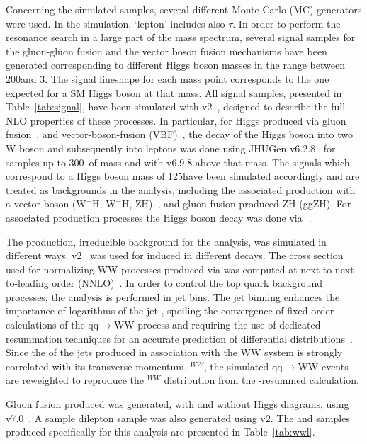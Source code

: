 Concerning the simulated samples, several different Monte Carlo (MC) generators were used. 
In the simulation, `lepton' includes also $\tau$.
In order to perform the resonance search in a large part of the mass spectrum,
several signal samples for the gluon-gluon fusion and the vector boson fusion
mechanisms have been generated corresponding to different Higgs boson masses
in the range between 200\GeV and 3\TeV. The signal lineshape for each mass point corresponds to the one expected for a SM Higgs boson at that mass.
All signal samples, presented in Table~\ref{tab:signal}, have been simulated with
\POWHEG v2~\cite{Nason:2004rx,Frixione:2007vw,Alioli:2010xd}, designed to describe the full NLO properties of these processes.
In particular, for Higgs produced via gluon fusion~\cite{Alioli:2008tz}, and vector-boson-fusion (VBF)~\cite{Nason:2009ai},
the decay of the Higgs boson into two W boson and subsequently into leptons
was done using JHUGen v6.2.8~\cite{jhugen} for samples up to 300~\GeV of mass
and with v6.9.8 above that mass.
The signals which correspond to a Higgs boson mass of 125\GeV have been simulated accordingly and are treated as backgrounds in the analysis, including the associated production with a vector boson ($\mathrm{W^{+}H}$, $\mathrm{W^{-}H}$, ZH)~\cite{Luisoni:2013kna}, and gluon fusion produced ZH (ggZH). For associated production processes the Higgs boson decay was done via ~\cite{Sjostrand:2007gs}.



The \WW production, irreducible background for the analysis, was simulated in different ways. 
\POWHEG v2~\cite{Melia:2011tj} was used for \qqbar induced \WW in different decays. 
The cross section used for normalizing WW processes produced via \qqbar was computed at next-to-next-to-leading order (NNLO)~\cite{Gehrmann:2014fva}. 
In order to control the top quark background processes, the analysis is
performed in jet bins. The jet binning enhances the importance of logarithms of the jet \pt, spoiling the convergence of 
fixed-order calculations of the qq$\rightarrow$WW process and requiring the use of dedicated resummation techniques for an
accurate prediction of differential
distributions~\cite{Meade:2014fca,Jaiswal:2014yba}.  
Since the \pt of the jets produced in association with the WW system is strongly correlated with its transverse momentum, 
\pt$^{WW}$,  the simulated qq$\rightarrow$WW events are reweighted  
to reproduce the \pt$^{WW}$ distribution from the \pt-resummed calculation.

Gluon fusion produced \WW was generated, with and without Higgs diagrams, using \MCFM v7.0~\cite{Campbell:2013wga}. 
A \ttbar sample dilepton sample was also generated using \POWHEG v2. The \WW and \ttbar samples 
produced specifically for this analysis are presented in Table~\ref{tab:wwl}.


